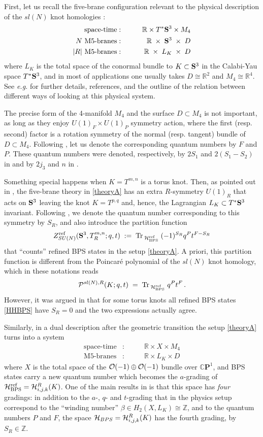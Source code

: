 \documentclass[hyper,letterpaper]{JHEP3}
\newcommand{\bea}{\begin{eqnarray}}
\newcommand{\eea}{\end{eqnarray}}
\newcommand{\be}{\begin{equation}}
\newcommand{\ee}{\end{equation}}
\newcommand{\Z}{{\mathbb Z}}
\newcommand{\R}{{\mathbb R}}
\def\Tr{{\rm Tr \,}}
\newcommand{\cO}{{\cal O }}
\newcommand{\cH}{{\cal H }}
\renewcommand{\P}{{\cal P}}
\newcommand{\cp}{{\mathbb{C}}{\mathbf{P}}}
\renewcommand{\S}{{\bf S}}
\begin{document}
First, let us recall the five-brane configuration relevant to the physical description of the $sl(N)$ knot homologies \cite{GSV,Gknothom,Wknothom}:
\bea
\text{space-time} & : & \qquad \R \times T^* \S^3 \times M_4 \nonumber \\
N~\text{M5-branes} & : & \qquad \R \; \times \; \S^3 \; \times \; D \label{theoryA} \\
|R|~\text{M5-branes} & : &  \qquad \R \; \times \; L_K \; \times \; D \nonumber
\eea
where $L_K$ is the total space of the conormal bundle to $K \subset \S^3$ in the Calabi-Yau space $T^* \S^3$,
and in most of applications one usually takes $D \cong \R^2$ and $M_4 \cong \R^4$.
See {\it e.g.} \cite{GS} for further details, references,
and the outline of the relation between different ways of looking at this physical system.

The precise form of the 4-manifold $M_4$ and the surface $D \subset M_4$ is not important,
as long as they enjoy $U(1)_F \times U(1)_P$ symmetry action, where the first (resp. second) factor
is a rotation symmetry of the normal (resp. tangent) bundle of $D \subset M_4$.
Following \cite{Wknothom}, let us denote the corresponding quantum numbers by $F$ and $P$.
These quantum numbers were denoted, respectively, by $2 S_1$ and $2(S_1 - S_2)$ in \cite{AS}
and by $2 j_3$ and $n$ in \cite{GS}.

Something special happens when $K = T^{m,n}$ is a torus knot. Then, as pointed out in \cite{AS},
the five-brane theory in \eqref{theoryA} has an extra $R$-symmetry $U(1)_R$ that acts on $\S^3$
leaving the knot $K = T^{p,q}$ and, hence, the Lagrangian $L_K \subset T^* \S^3$ invariant.
Following \cite{AS}, we denote the quantum number corresponding to this symmetry by $S_R$,
and also introduce the partition function
\be
Z^{\text{ref}}_{SU(N)}(\S^3, T^{m,n}_R; q, t) \; := \; \Tr_{\cH^{\text{ref}}_{\text{BPS}}} \; (-1)^{S_R} q^{P} t^{F - S_R}
\label{Zrefdef}
\ee
that ``counts'' refined BPS states in the setup \eqref{theoryA}.
A priori, this partition function is different from the Poincar\'e polynomial
of the $sl(N)$ knot homology, which in these notations reads
\be
\P^{sl(N), R} (K;q,t) \; = \; \Tr_{\cH^{\text{ref}}_{\text{BPS}}} \; q^{P} t^{F} \,.
\label{ZrefdefP}
\ee
However, it was argued in \cite{AS} that for some torus knots all refined BPS states \eqref{HHBPS}
have $S_R=0$ and the two expressions actually agree.

Similarly, in a dual description after the geometric transition the setup \eqref{theoryA} turns into a system
\bea
\text{space-time} & : & \qquad \R \times X \times M_4 \label{theoryB} \\
\text{M5-branes} & : &  \qquad \R \times L_K \times D \nonumber
\eea
where $X$ is the total space of the $\cO (-1) \oplus \cO (-1)$ bundle over $\cp^1$,
and BPS states carry a new quantum number which becomes the $a$-grading of $\cH^{\text{ref}}_{\text{BPS}} = \cH^R_{i,j,k} (K)$.
One of the main results in \cite{AS} is that this space has {\it four} gradings: in addition to
the $a$-, $q$- and $t$-grading that in the physics setup correspond to the ``winding number'' $\beta \in H_2 (X,L_K) \cong \Z$,
and to the quantum numbers $P$ and $F$, the space $\cH_{BPS} = \cH^R_{i,j,k} (K)$ has the fourth grading, by $S_R \in \Z$.
\end{document}
